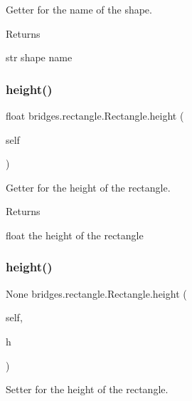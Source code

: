 Getter for the name of the shape. 

\begin{DoxyReturn}{Returns}


str shape name 
\end{DoxyReturn}
\mbox{\label{classbridges_1_1rectangle_1_1_rectangle_a51cfc55864a3b7643cfc6e3ba9dca161}} 
\subsubsection{\texorpdfstring{height()}{height()}\hspace{0.1cm}{\footnotesize\ttfamily [1/2]}}
{\footnotesize\ttfamily  float bridges.\+rectangle.\+Rectangle.\+height (\begin{DoxyParamCaption}\item[{}]{self }\end{DoxyParamCaption})}



Getter for the height of the rectangle. 

\begin{DoxyReturn}{Returns}


float the height of the rectangle 
\end{DoxyReturn}
\mbox{\label{classbridges_1_1rectangle_1_1_rectangle_afb7a48d758122bc02a2c53e362f65b7e}} 
\subsubsection{\texorpdfstring{height()}{height()}\hspace{0.1cm}{\footnotesize\ttfamily [2/2]}}
{\footnotesize\ttfamily  None bridges.\+rectangle.\+Rectangle.\+height (\begin{DoxyParamCaption}\item[{}]{self,  }\item[{}]{h }\end{DoxyParamCaption})}



Setter for the height of the rectangle. 


